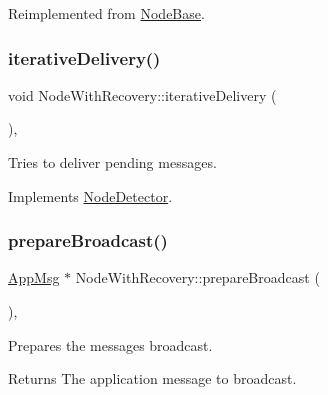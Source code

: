 Reimplemented from \hyperlink{class_node_base_add2450264be5dd616f9f9ac94e83b988}{Node\+Base}.

\mbox{\label{class_node_with_recovery_a9b61912f38b62452584dc80bf261ef4e}} 
\subsubsection{\texorpdfstring{iterative\+Delivery()}{iterativeDelivery()}}
{\footnotesize\ttfamily void Node\+With\+Recovery\+::iterative\+Delivery (\begin{DoxyParamCaption}{ }\end{DoxyParamCaption})\hspace{0.3cm}{\ttfamily [protected]}, {\ttfamily [virtual]}}



Tries to deliver pending messages. 



Implements \hyperlink{class_node_detector_a17ecf9939fce7471f4513b66185743cc}{Node\+Detector}.

\mbox{\label{class_node_with_recovery_a33d8e8775fd69cb647b38a54b36e1ebe}} 
\subsubsection{\texorpdfstring{prepare\+Broadcast()}{prepareBroadcast()}}
{\footnotesize\ttfamily \hyperlink{class_app_msg}{App\+Msg} $\ast$ Node\+With\+Recovery\+::prepare\+Broadcast (\begin{DoxyParamCaption}{ }\end{DoxyParamCaption})\hspace{0.3cm}{\ttfamily [protected]}, {\ttfamily [virtual]}}



Prepares the message\textquotesingle{}s broadcast. 

\begin{DoxyReturn}{Returns}
The application message to broadcast. 
\end{DoxyReturn}



